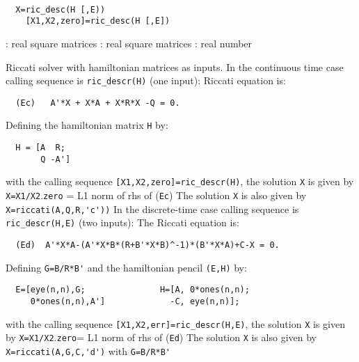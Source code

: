 \begin{mandesc}
   \\ %
\end{mandesc}
\begin{calling_sequence}
\begin{verbatim}
  X=ric_desc(H [,E))  
    [X1,X2,zero]=ric_desc(H [,E])  
\end{verbatim}
\end{calling_sequence}
\begin{parameters}
  \begin{varlist}
    : real square matrices
    : real square matrices
    : real number
  \end{varlist}
\end{parameters}
\begin{mandescription}
  Riccati solver with hamiltonian matrices as inputs.
  In the continuous time case calling sequence is \verb!ric_descr(H)! (one input):
  Riccati equation is:
\begin{verbatim}
  (Ec)   A'*X + X*A + X*R*X -Q = 0.
\end{verbatim}
  Defining the hamiltonian matrix \verb!H! by:
\begin{verbatim}
  H = [A  R;
       Q -A']
\end{verbatim}
  with the calling sequence \verb![X1,X2,zero]=ric_descr(H)!, the 
  solution \verb!X! is given by \verb!X=X1/X2!.\verb!zero! = L1 norm of rhs of (\verb!Ec!)
  The solution \verb!X! is also given by \verb!X=riccati(A,Q,R,'c'))!
  In the discrete-time case calling sequence is \verb!ric_descr(H,E)! (two inputs):
  The Riccati equation is:
\begin{verbatim}
  (Ed)  A'*X*A-(A'*X*B*(R+B'*X*B)^-1)*(B'*X*A)+C-X = 0.
\end{verbatim}
  Defining \verb!G=B/R*B'! and the hamiltonian pencil \verb!(E,H)! by:
\begin{verbatim}
  E=[eye(n,n),G;               H=[A, 0*ones(n,n);
     0*ones(n,n),A']             -C, eye(n,n)];
\end{verbatim}
  with the calling sequence \verb![X1,X2,err]=ric_descr(H,E)!, the 
  solution \verb!X! is given by \verb!X=X1/X2!.\verb!zero!= L1 norm of rhs of (\verb!Ed!)
  The solution \verb!X! is also given by \verb!X=riccati(A,G,C,'d')!  
  with \verb!G=B/R*B'!
\end{mandescription}
\begin{manseealso}
\end{manseealso}
